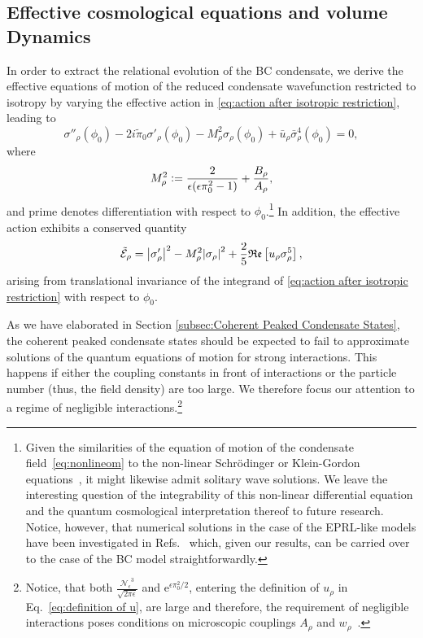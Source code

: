 \documentclass[11pt,a4paper]{article}
\newcommand{\e}{\textrm{e}}
\newcommand{\defeq}{\vcentcolon=}
\begin{document}
\subsection{Effective cosmological equations and volume Dynamics}\label{subsec:Effective Equations and Volume Dynamics}

In order to extract the relational evolution of the BC condensate, we derive the effective equations of motion of the reduced condensate wavefunction restricted to isotropy by varying the effective action in \eqref{eq:action after isotropic restriction}, leading to
%
\begin{equation}\label{eq:nonlineom}
\sigma''_{\rho}(\phi_0) -2i\tilde{\pi}_0\sigma'_{\rho}(\phi_0)-M_{\rho}^2\sigma_{\rho}(\phi_0)+\bar{u}_{\rho}\bar{\sigma}^4_{\rho}(\phi_0) = 0,
\end{equation}
%
where 
%
\begin{equation}
M_{\rho}^2
\defeq
\frac{2}{\epsilon(\epsilon\pi_0^2-1)}+\frac{B_{\rho}}{A_{\rho}},
\end{equation}
%
and prime denotes differentiation with respect to $\phi_0$.\footnote{Given the similarities of the equation of motion of the condensate field~\eqref{eq:nonlineom} to the non-linear Schr{\"o}dinger or Klein-Gordon equations~\cite{Vachaspati:2006zz}, it might likewise admit solitary wave solutions. We leave the interesting question of the integrability of this non-linear differential equation and the quantum cosmological interpretation thereof to future research. Notice, however, that numerical solutions in the case of the EPRL-like models have been investigated in Refs.~\cite{deCesare:2016rsf,Pithis:2016cxg} which, given our results, can be carried over to the case of the BC model straightforwardly.} In addition, the effective action exhibits a conserved quantity
%
\begin{equation}
\tilde{\mathcal{E}}_{\rho} 
=
\abs{\sigma'_{\rho}}^2-M_{\rho}^2\abs{\sigma_{\rho}}^2+\frac{2}{5}\mathfrak{Re}\left[u_{\rho}\sigma_{\rho}^5\right],
\end{equation}
%
arising from translational invariance of the integrand of \eqref{eq:action after isotropic restriction} with respect to $\phi_0$.

As we have elaborated in Section \ref{subsec:Coherent Peaked Condensate States}, the coherent peaked condensate states should be expected to fail to approximate solutions of the quantum equations of motion for strong interactions. This happens if either the coupling constants in front of interactions or the particle number (thus, the field density) are too large. We therefore focus our attention to a regime of negligible interactions.\footnote{Notice, that both $\frac{\mathcal{N_{\epsilon}}^3}{\sqrt{2\pi\epsilon}}$ and $\e^{\epsilon\pi_0^2/2}$, entering the definition of $u_{\rho}$ in Eq.~\eqref{eq:definition of u}, are large and therefore, the requirement of negligible interactions poses conditions on microscopic couplings $A_{\rho}$ and $w_{\rho}$~\cite{Marchetti:2020umh}.}
\end{document}
